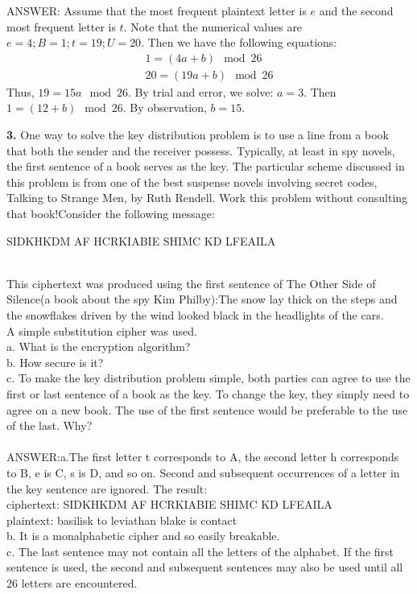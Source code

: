 \documentclass[paper=a4, fontsize=11pt]{scrartcl} %
\numberwithin{equation}{section} %
\numberwithin{figure}{section} %
\numberwithin{table}{section} %
\begin{document}
ANSWER:
 Assume that the most frequent plaintext letter is $e$ and the second
 most frequent letter is $t$. Note that the numerical values are $e =
 4; B = 1; t = 19; U = 20$. Then we have the following equations:
 \begin{eqnarray*}
        1 = (4a + b) \mod 26\\
        20 = (19a + b) \mod 26
 \end{eqnarray*}
 Thus, $19 = 15a \mod 26$. By trial and error, we solve: $a = 3$.
 Then $1 = (12 + b) \mod 26$. By observation, $b = 15$.

\textbf{3.} One way to solve the key distribution problem is to use a line from a book that both the sender and the receiver possess. Typically, at least in spy novels, the first sentence of a book serves as the key. The particular scheme discussed in this problem is from one of the best suspense novels involving secret codes, Talking to Strange Men, by Ruth Rendell. Work this problem without consulting that book!Consider the following message:\\
\centerline{SIDKHKDM AF HCRKIABIE SHIMC KD LFEAILA}\\
This ciphertext was produced using the first sentence of The Other Side of Silence(a book about the spy Kim Philby):The snow lay thick on the steps and the snowflakes driven by the wind looked black in the headlights of the cars.\\
A simple substitution cipher was used.\\
a. What is the encryption algorithm?\\
b. How secure is it?\\
c. To make the key distribution problem simple, both parties can agree to use the first or last sentence of a book as the key. To change the key, they simply need to agree on a new book. The use of the first sentence would be preferable to the use of the last. Why?\\
\\
ANSWER:a.The first letter t corresponds to A, the second letter h corresponds to B, e is C, s is D, and so on. Second and subsequent occurrences of a letter in the key sentence are ignored. The result:\\
ciphertext:  SIDKHKDM AF HCRKIABIE SHIMC KD LFEAILA\\
plaintext:   basilisk to leviathan blake is contact\\
        b.      It is a monalphabetic cipher and so easily breakable.\\
        c.      The last sentence may not contain all the letters of the alphabet. If the first sentence is used, the second and subsequent sentences may also be used until all 26 letters are encountered.\\
\end{document}

